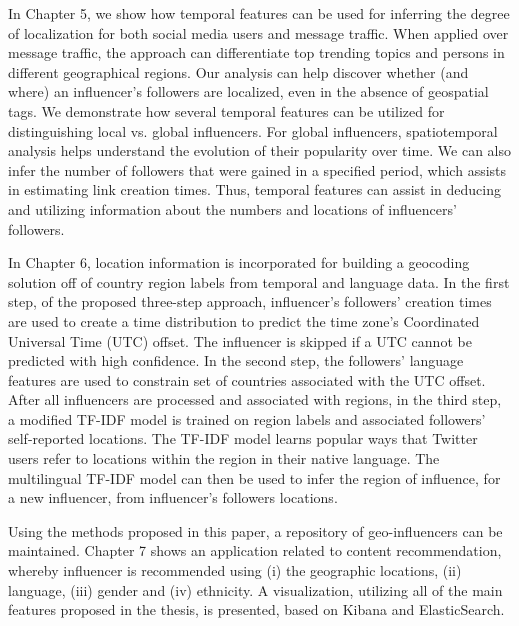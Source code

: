 In Chapter 5, we show how temporal features can be used for inferring the degree of localization for both social media users and message traffic. When applied over message traffic, the approach can differentiate top trending topics and persons in different geographical regions. Our analysis can help discover whether (and where) an influencer's followers are localized, even in the absence of geospatial tags. We demonstrate how several temporal features can be utilized for distinguishing local vs. global influencers. For global influencers, spatiotemporal analysis helps understand the evolution of their popularity over time.  We can also infer the number of followers that were gained in a specified period, which assists in estimating link creation times. Thus, temporal features can assist in deducing and utilizing information about the numbers and locations of influencers' followers.

In Chapter 6, location information is incorporated for building a geocoding solution off of country region labels from temporal and language data. In the first step, of the proposed three-step approach, influencer's followers' creation times are used to create a time distribution to predict the time zone's Coordinated Universal Time (UTC) offset. The influencer is skipped if a UTC cannot be predicted with high confidence. In the second step, the followers' language features are used to constrain set of countries associated with the UTC offset. After all influencers are processed and associated with regions, in the third step, a modified TF-IDF model is trained on region labels and associated followers' self-reported locations. The TF-IDF model learns popular ways that Twitter users refer to locations within the region in their native language. The multilingual TF-IDF model can then be used to infer the region of influence, for a new influencer, from influencer's followers locations.

Using the methods proposed in this paper, a repository of geo-influencers can be maintained. Chapter 7 shows an application related to content recommendation, whereby influencer is recommended using (i) the geographic locations, (ii) language, (iii) gender and (iv) ethnicity. A visualization, utilizing all of the main features proposed in the thesis, is presented, based on Kibana and ElasticSearch. 

